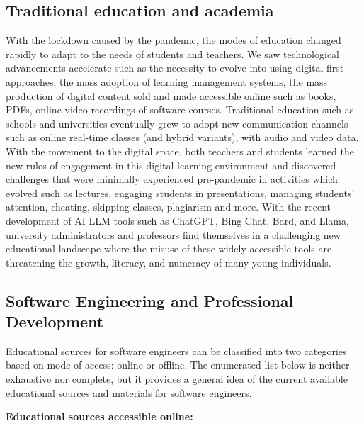 \documentclass[journal, onecolumn]{IEEEtran}
\begin{document}
\subsection{Traditional education and academia}
With the lockdown caused by the pandemic, the modes of education changed rapidly to 
adapt to the needs of students and teachers. We saw technological advancements 
accelerate such as the necessity to evolve into using digital-first approaches, the
mass adoption of learning management systems, the mass production of digital content 
sold and made accessible online such as books, PDFs, online video recordings of 
software courses. 
Traditional education such as schools and universities eventually grew to adopt 
new communication channels such as online real-time classes (and hybrid variants), with audio and video data. 
With the movement to the digital space, both teachers and students learned the new 
rules of engagement in this digital learning environment and discovered challenges that were minimally 
experienced pre-pandemic in activities which evolved such as lectures, engaging students in presentations, 
managing students' attention, cheating, skipping classes, plagiarism and more.
With the recent development of AI LLM tools such as ChatGPT, Bing Chat, Bard, and 
Llama, university administrators and professors find themselves in a challenging
new educational landscape where the misuse of these widely accessible tools are 
threatening the growth, literacy, and numeracy of many young individuals.

\subsection{Software Engineering and Professional Development}
\label{sec:edu_sources}
Educational sources for software engineers can be classified into two categories
 based on mode of access: online or offline. The enumerated list below is neither 
 exhaustive nor complete, but it provides a general idea of the current available 
 educational sources and materials for software engineers.

\textbf{Educational sources accessible online:}
\end{document}
